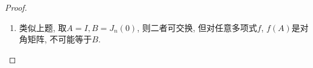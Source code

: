 \documentclass{ctexart}
\begin{document}
\begin{proof}
\begin{enumerate}
\begin{align*}
\begin{bmatrix}
					b_{n1} & b_{n2} & \cdots & b_{nn}\\
				\end{bmatrix}\begin{bmatrix}
					& 1\\ && \ddots \\ &&& 1\\ \\
				\end{bmatrix}
				={\color{blue}\begin{bmatrix}
                    & b_{12} & b_{13} & \cdots \\
                    & 	b_{22} & b_{23} & \cdots \\
                    & 	\vdots & \vdots &   \\
                    & 	b_{n2} & b_{n3} & \cdots \\
                    \end{bmatrix}}
			\end{align*}
			比较得到
			\[
				B=\begin{bmatrix}
				b_{11} & b_{12} & \cdots & b_{1n}\\
				 & b_{11} & \cdots & b_{1,n-1}\\
				 &  & \ddots & \vdots \\
				 &  &  & b_{11}\\
			 \end{bmatrix}=b_{11}I+b_{12}J_n(0)+\dots+b_{1n}J_n(0)^{n-1}
			 =b_{11}I+b_{12}(A-\lambda I)+\dots +b_{1n}(A-\lambda I)^{n-1}
			 .
			\]
		 \item 类似上题, 取$A=I,B=J_n(0)$, 则二者可交换, 但对任意多项式$f$, $f(A)$是对角矩阵, 不可能等于$B$. 
	\end{enumerate}
\end{proof}
\end{document}
